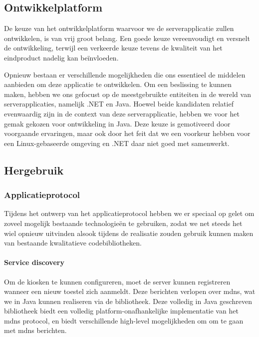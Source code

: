 \subsection{Ontwikkelplatform}

De keuze van het ontwikkelplatform waarvoor we de serverapplicatie zullen ontwikkelen, is van vrij groot belang. Een goede keuze vereenvoudigt en versnelt de ontwikkeling, terwijl een verkeerde keuze tevens de kwaliteit van het eindproduct nadelig kan beïnvloeden.

Opnieuw bestaan er verschillende mogelijkheden die ons essentieel de middelen aanbieden om deze applicatie te ontwikkelen. Om een beslissing te kunnen maken, hebben we ons gefocust op de meestgebruikte entiteiten in de wereld van serverapplicaties, namelijk .NET en Java. Hoewel beide kandidaten relatief evenwaardig zijn in de context van deze serverapplicatie, hebben we voor het gemak gekozen voor ontwikkeling in Java. Deze keuze is gemotiveerd door voorgaande ervaringen, maar ook door het feit dat we een voorkeur hebben voor een Linux-gebaseerde omgeving en .NET daar niet goed met samenwerkt.

\subsection{Hergebruik}

\subsubsection{Applicatieprotocol}

Tijdens het ontwerp van het applicatieprotocol hebben we er speciaal op gelet om zoveel mogelijk bestaande technologieën te gebruiken, zodat we net steeds het wiel opnieuw uitvinden alsook tijdens de realisatie zouden gebruik kunnen maken van bestaande kwalitatieve codebibliotheken.

\paragraph{Service discovery} Om de kiosken te kunnen configureren, moet de server kunnen registreren wanneer een nieuw toestel zich aanmeldt. Deze berichten verlopen over \ac{mdns}, wat we in Java kunnen realiseren via de  bibliotheek. Deze volledig in Java geschreven bibliotheek biedt een volledig platform-onafhankelijke implementatie van het \ac{mdns} protocol, en biedt verschillende high-level mogelijkheden om om te gaan met \ac{mdns} berichten.

